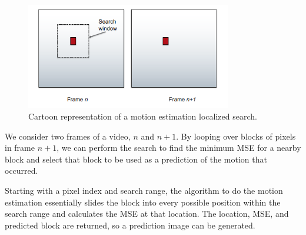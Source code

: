 \documentclass[11pt,a4paper]{article}
\begin{document}
\begin{figure}[ht]
	\centering
	\includegraphics[width=0.8\textwidth]{motion_search}
	\caption{Cartoon representation of a motion estimation localized search.}
	\label{fig:search}
\end{figure}

We consider two frames of a video, $n$ and $n+1$. By looping over blocks of pixels in frame $n+1$, we can perform the search to find the minimum MSE for a nearby block and select that block to be used as a prediction of the motion that occurred.

Starting with a pixel index and search range, the algorithm to do the motion estimation essentially slides the block into every possible position within the search range and calculates the MSE at that location. The location, MSE, and predicted block are returned, so a prediction image can be generated. 

\pagebreak
\end{document}
